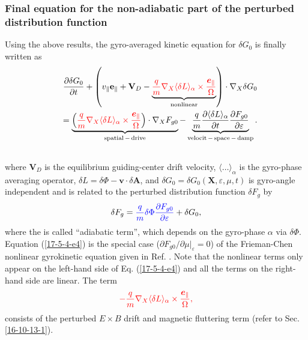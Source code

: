\documentclass{llncs}
\newcommand{\nobracket}{}
\newcommand{\tmcolor}[2]{{\color{#1}{#2}}}
\newcommand{\tmmathbf}[1]{\ensuremath{\boldsymbol{#1}}}
\newcommand{\tmop}[1]{\ensuremath{\operatorname{#1}}}
\begin{document}
\subsubsection{Final equation for the non-adiabatic part of the perturbed
distribution function}

Using the above results, the gyro-averaged kinetic equation for $\delta G_0$
is finally written as
\begin{eqnarray}
  &  & \frac{\partial \delta G_0}{\partial t} + \left( v_{\parallel}
  \mathbf{e}_{\parallel} +\mathbf{V}_D - \underbrace{\tmcolor{red}{\frac{q}{m}
  \nabla_X \langle \delta L \rangle_{\alpha} \times
  \frac{\tmmathbf{e}_{\parallel}}{\Omega}}}_{\tmop{nonlinear}} \right) \cdot
  \nabla_X \delta G_0 \nonumber\\
  &  & = \underbrace{\left( \tmcolor{red}{\frac{q}{m} \nabla_X \langle \delta
  L \rangle_{\alpha} \times \frac{\tmmathbf{e}_{\parallel}}{\Omega}} \right)
  \cdot \nabla_X F_{g 0}}_{\tmop{spatial} - \tmop{drive}} -
  \underbrace{\frac{q}{m}  \frac{\partial \langle \delta L
  \rangle_{\alpha}}{\partial t}  \frac{\partial F_{g 0}}{\partial
  \varepsilon}}_{\tmop{velocit} - \tmop{space} - \tmop{damp}} . 
  \label{17-5-4-e4}\\
  &  &  \nonumber
\end{eqnarray}
where $\mathbf{V}_D$ is the equilibrium guiding-center drift velocity,
$\langle \ldots \rangle_{\alpha}$ is the gyro-phase averaging operator,
$\delta L = \delta \Phi -\mathbf{v} \cdot \delta \mathbf{A}$, and $\delta G_0
= \delta G_0 (\mathbf{X}, \varepsilon, \mu, t)$ is gyro-angle independent and
is related to the perturbed distribution function $\delta F_g$ by
\begin{equation}
  \delta F_g = \tmcolor{blue}{\frac{q}{m} \delta \Phi \frac{\partial F_{g
  0}}{\partial \varepsilon}} + \delta G_0,
\end{equation}
where the \tmcolor{blue}{first term} is called ``adiabatic term'', which
depends on the gyro-phase $\alpha$ via $\delta \Phi$. Equation
(\ref{17-5-4-e4}) is the special case ($\partial F_{g 0} / \partial \mu
|_{\varepsilon} \nobracket = 0$) of the Frieman-Chen nonlinear gyrokinetic
equation given in Ref. {\cite{frieman1982}}. Note that the nonlinear terms
only appear on the left-hand side of Eq. (\ref{17-5-4-e4}) and all the terms
on the right-hand side are linear. The term
\begin{equation}
  \tmcolor{red}{- \frac{q}{m} \nabla_X \langle \delta L \rangle_{\alpha}
  \times \frac{\tmmathbf{e}_{\parallel}}{\Omega},}
\end{equation}
consists of the perturbed $E \times B$ drift and magnetic fluttering term
(refer to Sec. \ref{16-10-13-1}).
\end{document}
